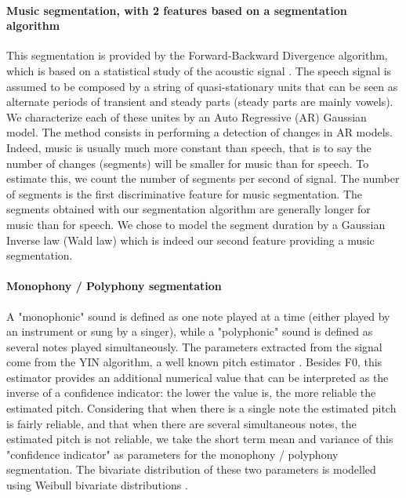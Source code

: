 \documentclass{sig-alternate}
\begin{document}
\paragraph{Music segmentation, with 2 features based on a segmentation algorithm} 
This segmentation is provided by the Forward-Backward Divergence algorithm, which is based on a statistical study of the acoustic signal \cite{Obrecht1988}. The speech signal is assumed to be composed by a string of quasi-stationary units that can be seen as alternate periods of transient and steady parts (steady parts are mainly vowels). We characterize  each of these unites by an Auto Regressive (AR) Gaussian model. The method consists in performing a detection of changes in AR models. Indeed, music is usually much more constant than speech, that is to say the number of changes (segments) will be smaller for music than for speech. To estimate this, we count the number of segments per second of signal. The number of segments is the first discriminative feature for music segmentation.
The segments obtained with our segmentation algorithm  are generally longer for music than for speech. We chose to model the segment duration by a Gaussian Inverse law (Wald law) which is indeed our second feature providing a music segmentation.


\paragraph{Monophony / Polyphony segmentation}
A "monophonic" sound is defined as one note played at a time (either played by an instrument or sung by a singer), while a "polyphonic" sound is defined as several notes played simultaneously. The parameters extracted from the signal come from the YIN algorithm, a well known pitch estimator \cite{DeCheveigne2002}. Besides F0, this estimator provides an additional numerical value that can be interpreted as the inverse of a confidence indicator: the lower the value is, the more reliable the estimated pitch. Considering that when there is a single note the estimated pitch is fairly reliable, and that when there are several simultaneous notes, the estimated pitch is not reliable, we take the short term mean and variance of this "confidence indicator" as parameters for the monophony / polyphony segmentation. The bivariate distribution of these two parameters is modelled using Weibull bivariate distributions \cite{Lachambre2011}.
\end{document}
